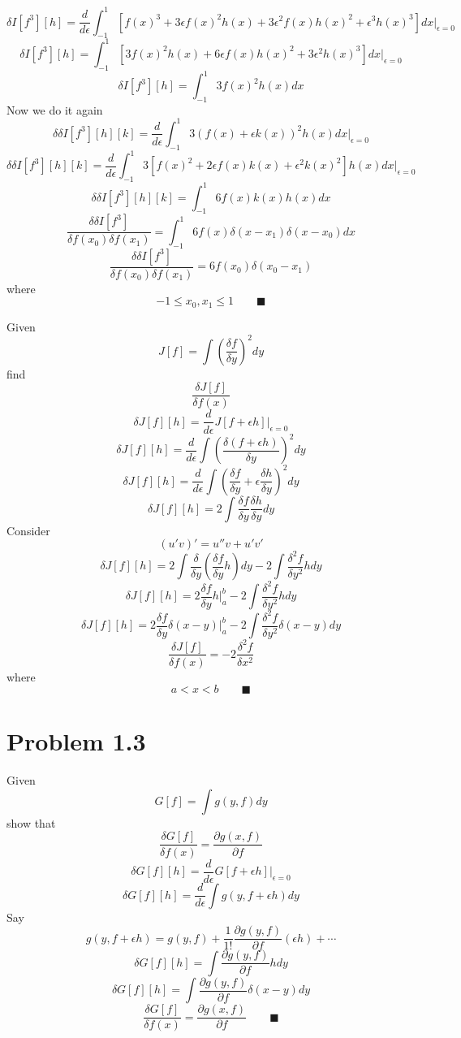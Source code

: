 \documentclass{amsart}
\begin{document}
\[\]
\[\delta I[f^3][h]=\frac{d}{d\epsilon}\int_{-1}^{1} [f(x)^3+3\epsilon f(x)^2 h(x)+3\epsilon^2 f(x)h(x)^2+\epsilon^3 h(x)^3] dx\Big\vert_{\epsilon=0}\]
\[\delta I[f^3][h]=\int_{-1}^{1} [3f(x)^2 h(x)+6\epsilon f(x)h(x)^2+3\epsilon^2 h(x)^3] dx\Big\vert_{\epsilon=0}\]
\[\delta I[f^3][h]=\int_{-1}^{1} 3f(x)^2 h(x) dx\]
Now we do it again
\[\delta \delta I[f^3][h][k]=\frac{d}{d\epsilon}\int_{-1}^{1} 3(f(x)+\epsilon k(x))^2 h(x) dx\Big\vert_{\epsilon=0}\]
\[\delta \delta I[f^3][h][k]=\frac{d}{d\epsilon}\int_{-1}^{1} 3[f(x)^2+2\epsilon f(x)k(x)+\epsilon^2 k(x)^2] h(x) dx\Big\vert_{\epsilon=0}\]
\[\delta \delta I[f^3][h][k]=\int_{-1}^{1} 6f(x)k(x)h(x) dx\]
\[\frac{\delta \delta I[f^3]}{\delta f(x_0)\delta f(x_1)}=\int_{-1}^{1} 6f(x)\delta(x-x_1)\delta(x-x_0) dx\]
\[\frac{\delta \delta I[f^3]}{\delta f(x_0)\delta f(x_1)}=6f(x_0)\delta(x_0-x_1)\] where \[-1\leq x_0, x_1\leq 1 \qquad \blacksquare\]



Given
\[J[f]=\int \left(\frac{\delta f}{\delta y}\right)^2 dy\]
find
\[\frac{\delta J[f]}{\delta f(x)}\]
\[\delta J[f][h]=\frac{d}{d\epsilon}J[f+\epsilon h]\Big\vert_{\epsilon=0}\]
\[\delta J[f][h]=\frac{d}{d\epsilon}\int \left(\frac{\delta (f+\epsilon h)}{\delta y}\right)^2 dy\]
\[\delta J[f][h]=\frac{d}{d\epsilon}\int \left(\frac{\delta f}{\delta y}+\epsilon\frac{\delta h}{\delta y} \right)^2 dy\]
\[\delta J[f][h]=2\int \frac{\delta f}{\delta y}\frac{\delta h}{\delta y}  dy\]
Consider
\[(u'v)'=u''v+u'v'\]
\[\delta J[f][h]=2\int\frac{\delta}{\delta y}\left(\frac{\delta f}{\delta y}h\right)dy-2\int\frac{\delta^2 f}{\delta y^2}h dy\]
\[\delta J[f][h]=2\frac{\delta f}{\delta y}h\Big\vert_a^b-2\int\frac{\delta^2 f}{\delta y^2}h dy\]
\[\delta J[f][h]=2\frac{\delta f}{\delta y}\delta(x-y)\Big\vert_a^b-2\int\frac{\delta^2 f}{\delta y^2}\delta(x-y) dy\]
\[\frac{\delta J[f]}{\delta f(x)}=-2\frac{\delta^2 f}{\delta x^2}\] where \[a<x<b \qquad \blacksquare\]

\section*{Problem 1.3}
Given \[G[f]=\int g(y,f)dy\]
show that \[\frac{\delta G[f]}{\delta f(x)}=\frac{\partial g(x,f)}{\partial f} \]
\[\delta G[f][h]=\frac{d}{d\epsilon}G[f+\epsilon h]\Big\vert_{\epsilon=0}\]
\[\delta G[f][h]=\frac{d}{d\epsilon}\int g(y,f+\epsilon h)dy\]
Say \[g(y,f+\epsilon h)=g(y,f)+\frac{1}{1!}\frac{\partial g(y,f)}{\partial f}(\epsilon h) + \cdots \]
\[\delta G[f][h]=\int\frac{\partial g(y,f)}{\partial f}hdy\]
\[\delta G[f][h]=\int\frac{\partial g(y,f)}{\partial f}\delta(x-y)dy\]
\[\frac{\delta G[f]}{\delta f(x)}=\frac{\partial g(x,f)}{\partial f} \qquad \blacksquare\]
\end{document}
